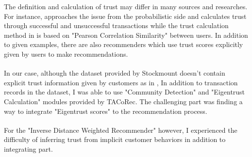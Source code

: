 The definition and calculation of trust may differ in many sources and researches. For instance, \cite{Eigentrust} approaches the issue from the probabilistic side and calculates trust through successful and unsuccessful transactions while the trust calculation method in \cite{papagelis_article} is based on "Pearson Correlation Similarity" between users. In addition to given examples, there are also recommenders\cite{massa_article} which use trust scores explicitly given by users to make recommendations. \\ \\
In our case, although the dataset provided by Stockmount doesn't contain explicit trust information given by customers as in \cite{massa_article}, In addition to transaction records in the dataset, I was able to use "Community Detection" and "Eigentrust Calculation" modules provided by TACoRec\cite{Tacorec}. The challenging part was finding a way to integrate "Eigentrust scores" to the recommendation process. \\ \\
For the "Inverse Distance Weighted Recommender" however, I experienced the difficulty of inferring trust from implicit customer behaviors in addition to integrating part. 